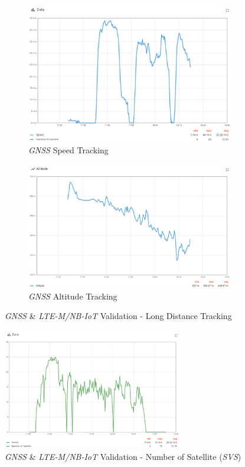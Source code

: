 \documentclass[Report.tex]{subfiles}
\begin{document}
\begin{figure}[H]
\begin{subfigure}{.45\textwidth}
\centering
\includegraphics[width=1\textwidth]{Include/Figure/result/tracking_exemple_4_speed.png}
\caption{\textit{GNSS} Speed Tracking}
\end{subfigure}	
\begin{subfigure}{.45\textwidth}
\centering
\includegraphics[width=1\textwidth]{Include/Figure/result/tracking_exemple_4_altitude.png}
\caption{\textit{GNSS} Altitude Tracking}
\end{subfigure}	
	\caption{\textit{GNSS} \& \textit{LTE-M/NB-IoT} Validation - Long Distance Tracking}
	\label{fig:tracking_exemple_1}
\end{figure}


\begin{figure}[H]
	\centering
	\includegraphics[width=0.7\textwidth]{Include/Figure/result/tracking_exemple_4_svs.png}
	\caption{\textit{GNSS} \& \textit{LTE-M/NB-IoT} Validation - Number of Satellite (\textit{SVS})}
	\label{fig:tracking_exemple_4_svs}
\end{figure}
\end{document}
